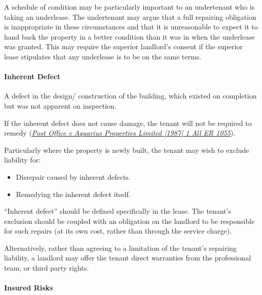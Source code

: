 \documentclass[
]{article}
\providecommand{\tightlist}{%
  \setlength{\itemsep}{0pt}\setlength{\parskip}{0pt}}
\begin{document}
A schedule of condition may be particularly important to an undertenant
who is taking an underlease. The undertenant may argue that a full
repairing obligation is inappropriate in these circumstances and that it
is unreasonable to expect it to hand back the property in a better
condition than it was in when the underlease was granted. This may
require the superior landlord's consent if the superior lease stipulates
that any underlease is to be on the same terms.

\hypertarget{inherent-defect}{%
\paragraph{Inherent Defect}\label{inherent-defect}}

A defect in the design/ construction of the building, which existed on
completion but was not apparent on inspection.

If the inherent defect does not cause damage, the tenant will not be
required to remedy
(\emph{\href{https://uk.practicallaw.thomsonreuters.com/D-009-7107?originationContext=document\&transitionType=PLDocumentLink\&contextData=(sc.Default)\&ppcid=966adc813d44458ba2271293efe92ed6}{Post
Office v Aquarius Properties Limited {[}1987{]} 1 All ER 1055}}).

Particularly where the property is newly built, the tenant may wish to
exclude liability for:

\begin{itemize}
\tightlist
\item
  Disrepair caused by inherent defects.
\item
  Remedying the inherent defect itself.
\end{itemize}

``Inherent defect'' should be defined specifically in the lease. The
tenant's exclusion should be coupled with an obligation on the landlord
to be responsible for such repairs (at its own cost, rather than through
the service charge).

Alternatively, rather than agreeing to a limitation of the tenant's
repairing liability, a landlord may offer the tenant direct warranties
from the professional team, or third party rights.

\hypertarget{insured-risks}{%
\paragraph{Insured Risks}\label{insured-risks}}
\end{document}
